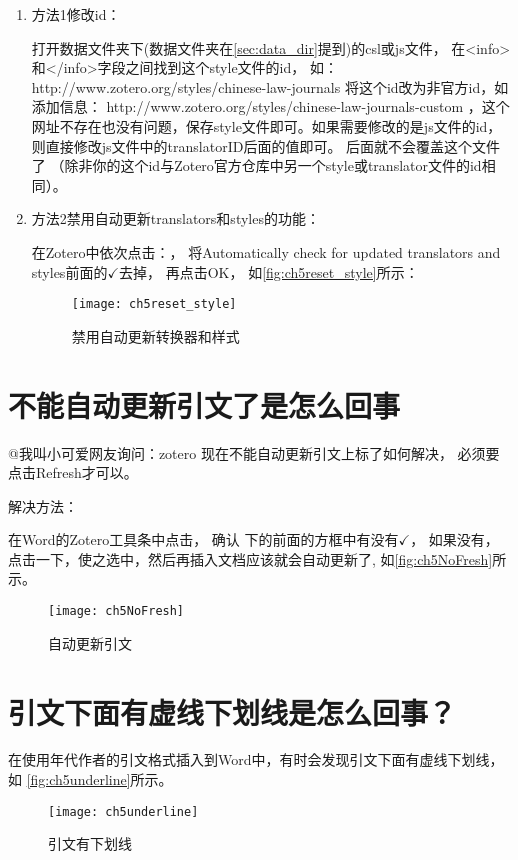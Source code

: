 \documentclass[cn,11pt,chinese]{elegantbook}
\begin{document}
			\begin{enumerate}
				\item 方法1修改id：
				
					打开数据文件夹下(数据文件夹在\cref{sec:data_dir}提到)的csl或js文件，
					在<info>和</info>字段之间找到这个style文件的id，
					如：http://www.zotero.org/styles/chinese-law-journals
					将这个id改为非官方id，如添加信息：			
					http://www.zotero.org/styles/chinese-law-journals-custom
					，这个网址不存在也没有问题，保存style文件即可。如果需要修改的是js文件的id，
					则直接修改js文件中的translatorID后面的值即可。
					后面就不会覆盖这个文件了
					（除非你的这个id与Zotero官方仓库中另一个style或translator文件的id相同）。
				\item 方法2禁用自动更新translators和styles的功能：
						
					在Zotero中依次点击：，			
					将Automatically check for updated translators and styles前面的$\checkmark$去掉，
					再点击OK，
					如\autoref{fig:ch5reset_style}所示：
						\begin{figure}[htbp]
							\centering
							\texttt{[image: ch5reset\_style]}
							\caption{禁用自动更新转换器和样式}
							\label{fig:ch5reset_style}
						\end{figure}
			\end{enumerate}

		\section{不能自动更新引文了是怎么回事}\label{sec:norefresh}
			@我叫小可爱网友询问：zotero 现在不能自动更新引文上标了如何解决，
			必须要点击Refresh才可以。
			
			解决方法：

			在Word的Zotero工具条中点击，
			确认
			下的前面的方框中有没有$\checkmark$，
			如果没有，点击一下，使之选中，然后再插入文档应该就会自动更新了,
			如\autoref{fig:ch5NoFresh}所示。
				\begin{figure}[htbp]
					\centering
					\texttt{[image: ch5NoFresh]}
					\caption{自动更新引文}
					\label{fig:ch5NoFresh}
				\end{figure}

		\section{引文下面有虚线下划线是怎么回事？}\label{sec:citationUnderline}
			在使用年代作者的引文格式插入到Word中，有时会发现引文下面有虚线下划线，如
			\autoref{fig:ch5underline}所示。
				\begin{figure}[htbp]
					\centering
					\texttt{[image: ch5underline]}
					\caption{引文有下划线}
					\label{fig:ch5underline}
				\end{figure}
\end{document}
